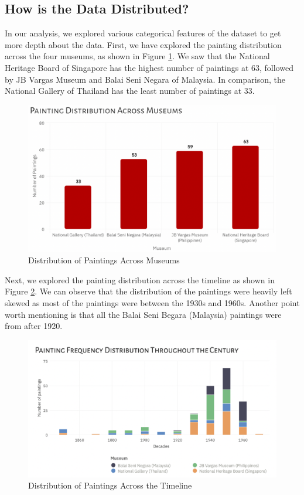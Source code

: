 \documentclass[11pt, oneside]{article}
\begin{document}
\subsection{How is the Data Distributed?}
In our analysis, we explored various categorical features of the dataset to get more depth about the data. First, we have explored the painting distribution across the four museums, as shown in Figure \ref{museum_dist}. We saw that the National Heritage Board of Singapore has the highest number of paintings at 63, followed by JB Vargas Museum and Balai Seni Negara of Malaysia. In comparison, the National Gallery of Thailand has the least number of paintings at 33.
\begin{figure}[H]
    \centering
    \includegraphics[scale=0.45]{images/museum_dist.png}
    \caption{Distribution of Paintings Across Museums}
    \label{museum_dist}
\end{figure}

\noindent Next, we explored the painting distribution across the timeline as shown in Figure \ref{time_dist}. We can observe that the distribution of the paintings were heavily left skewed as most of the paintings were between the 1930s and 1960s. Another point worth mentioning is that all the Balai Seni Begara (Malaysia) paintings were from after 1920.
\begin{figure}[H]
    \centering
    \includegraphics[scale=0.5]{images/time_dist.png}
    \caption{Distribution of Paintings Across the Timeline}
    \label{time_dist}
\end{figure}
\end{document}

